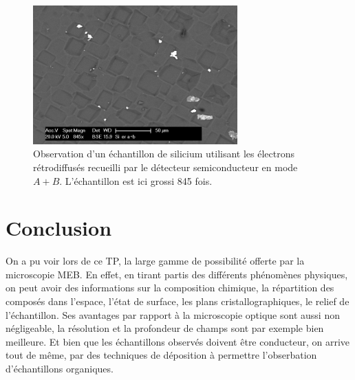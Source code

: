 \documentclass[a4paper,12pt]{article}
\begin{document}
\begin{figure}
\centering
\includegraphics[width=0.7\textwidth]{images/si_er_apb.png}
\caption{Observation d'un échantillon de silicium utilisant les électrons rétrodiffusés recueilli par le détecteur semiconducteur en mode $A+B$. L'échantillon est ici grossi 845 fois.}
\label{fig:si_er_apb}
\end{figure}

\section*{Conclusion}

On a pu voir lors de ce TP, la large gamme de possibilité offerte par la microscopie MEB. En effet, en tirant partis des différents phénomènes physiques, on peut avoir des informations sur la composition chimique, la répartition des composés dans l'espace, l'état de surface, les plans cristallographiques, le relief de l'échantillon. Ses avantages par rapport à la microscopie optique sont aussi non négligeable, la résolution et la profondeur de champs sont par exemple bien meilleure. Et bien que les échantillons observés doivent être conducteur, on arrive tout de même, par des techniques de déposition à permettre l'obserbation d'échantillons organiques.
\end{document}
